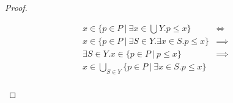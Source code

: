 \begin{proof}
\begin{enumerate}
\begin{itemize}
	$$
	\begin{array}{lll}
	x \in \{p \in P\ |\ \exists x \in \bigcup Y. p \leq x\} & \iff & \\
	x \in \{p \in P\ |\ \exists S \in Y.\exists x \in S. p \leq x \} & \implies & \\
	\exists S \in Y.x \in \{p \in P\ |\ p \leq x \} & \implies & \\
	x \in \bigcup_{S \in Y} \{p \in P\ |\ \exists x \in S. p \leq x\} & & \\
	
	\end{array}
	$$
\end{itemize}

\end{enumerate}

\end{proof}

\let\powerset\undefined
